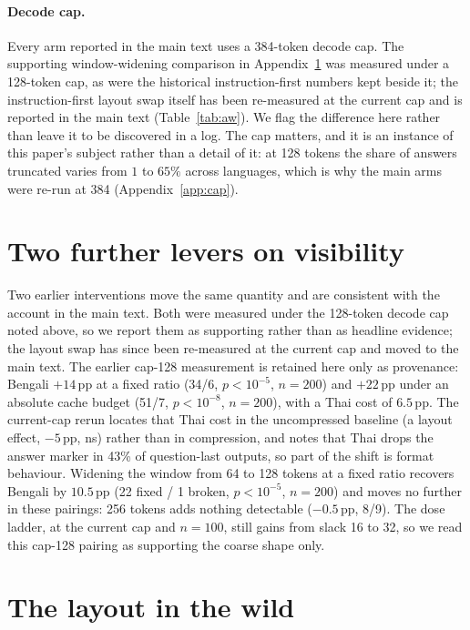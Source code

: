 \documentclass{article}
\begin{document}
\paragraph{Decode cap.}
Every arm reported in the main text uses a 384-token decode cap. The
supporting window-widening comparison in Appendix~\ref{app:levers} was
measured under a 128-token cap, as were the historical instruction-first
numbers kept beside it; the instruction-first layout swap itself has
been re-measured at the current cap and is reported in the main text
(Table~\ref{tab:aw}). We flag the difference here rather than
leave it to be discovered in a log. The cap matters, and it is an
instance of this paper's subject rather than a detail of it: at 128
tokens the share of answers truncated varies from $1$ to $65\%$ across
languages, which is why the main arms were re-run at 384
(Appendix~\ref{app:cap}).

\section{Two further levers on visibility}
\label{app:levers}

Two earlier interventions move the same quantity and are consistent with
the account in the main text. Both were measured under the 128-token
decode cap noted above, so we report them as supporting rather than as
headline evidence; the layout swap has since been re-measured at the
current cap and moved to the main text. The earlier cap-128
measurement is retained here only as provenance: Bengali $+14$\,pp at
a fixed ratio (34/6, $p{<}10^{-5}$, $n{=}200$) and $+22$\,pp under an
absolute cache budget (51/7, $p{<}10^{-8}$, $n{=}200$), with a Thai
cost of $6.5$\,pp. The current-cap rerun locates that Thai cost in the
uncompressed baseline (a layout effect, $-5$\,pp, ns) rather than in
compression, and notes that Thai drops the answer marker in 43\% of
question-last outputs, so part of the shift is format behaviour. Widening the window from 64 to 128 tokens at a fixed
ratio recovers Bengali by $10.5$\,pp (22 fixed / 1 broken,
$p{<}10^{-5}$, $n{=}200$) and moves no further in these pairings: 256
tokens adds nothing detectable ($-0.5$\,pp, 8/9). The dose ladder, at the
current cap and $n{=}100$, still gains from slack 16 to 32, so we read this
cap-128 pairing as supporting the coarse shape only.

\section{The layout in the wild}
\label{app:wild}
\end{document}
